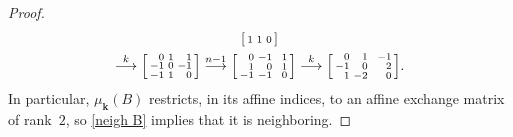\documentclass{amsart}
\theoremstyle{definition}
\theoremstyle{remark}
\numberwithin{equation}{section}
\newcommand{\0}{{\mathbf{0}}}
\newcommand{\kk}{{\boldsymbol{k}}}
\begin{document}
\begin{proof}
\begin{multline*}
\begin{bsmallmatrix*}[r]
1&1&0
\end{bsmallmatrix*}\\
\overset{k}{\longrightarrow}
\begin{bsmallmatrix*}[r]
0&1&\,\,\,1\\
-1&0&-1\\
-1&1&0
\end{bsmallmatrix*}
\overset{n-1}{\longrightarrow}
\begin{bsmallmatrix*}[r]
0&-1&\,\,\,1\\
1&0&1\\
-1&-1&0
\end{bsmallmatrix*}
\overset{k}{\longrightarrow}
\begin{bsmallmatrix*}[r]
0&1&\,\,\,-1\\
-1&0&2\\
1&-2&0
\end{bsmallmatrix*}.
\end{multline*}
In particular, $\mu_\kk(B)$ restricts, in its affine indices, to an affine exchange matrix of rank~$2$,
so \cref{neigh B} implies that it is neighboring.


\end{proof}
\end{document}
